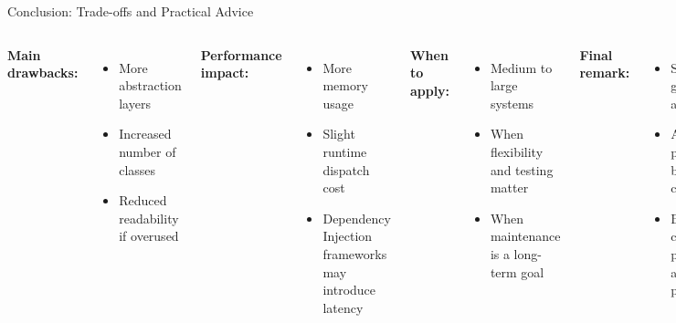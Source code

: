 \documentclass[aspectratio=169, table]{beamer}
\begin{document}
\begin{frame}[fragile]{Conclusion: Trade-offs and Practical Advice}
	\vspace{20pt}
	\begin{columns}[T]
		\textbf{Main drawbacks:}
		\begin{itemize}
			\item More abstraction layers
			\item Increased number of classes
			\item Reduced readability if overused
		\end{itemize}
		
		\textbf{Performance impact:}
		\begin{itemize}
			\item More memory usage
			\item Slight runtime dispatch cost
			\item Dependency Injection frameworks may introduce latency
		\end{itemize}
		
		\textbf{When to apply:}
		\begin{itemize}
			\item Medium to large systems
			\item When flexibility and testing matter
			\item When maintenance is a long-term goal
		\end{itemize}
		
		\textbf{Final remark:}
		\begin{itemize}
			\item SOLID is a guideline, not a rule
			\item Apply pragmatically based on context
			\item Balance clarity, performance, and design purity
		\end{itemize}
	\end{columns}
\end{frame}
\end{document}
